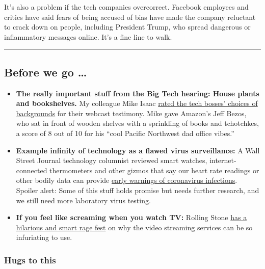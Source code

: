 It's also a problem if the tech companies overcorrect. Facebook
employees and critics have said fears of being accused of bias have made
the company reluctant to crack down on people, including President
Trump, who spread dangerous or inflammatory messages online. It's a fine
line to walk.

\begin{center}\rule{0.5\linewidth}{\linethickness}\end{center}

\hypertarget{before-we-go-}{%
\subsection{Before we go \ldots{}}\label{before-we-go-}}

\begin{itemize}
\item
  \textbf{The really important stuff from the Big Tech hearing: House
  plants and bookshelves.} My colleague Mike Isaac
  \href{https://www.nytimes.com/live/2020/07/29/technology/tech-ceos-hearing-testimony/tech-executives-looked-like-they-work-in-well-tech-offices}{rated
  the tech bosses' choices of backgrounds} for their webcast testimony.
  Mike gave Amazon's Jeff Bezos, who sat in front of wooden shelves with
  a sprinkling of books and tchotchkes, a score of 8 out of 10 for his
  ``cool Pacific Northwest dad office vibes.''
\item
  \textbf{Example infinity of technology as a flawed virus
  surveillance:} A Wall Street Journal technology columnist reviewed
  smart watches, internet-connected thermometers and other gizmos that
  say our heart rate readings or other bodily data can provide
  \href{https://www.wsj.com/articles/could-you-have-covid-19-soon-your-smartwatch-or-smart-ring-might-tell-you-11595949072}{early
  warnings of coronavirus infections}. Spoiler alert: Some of this stuff
  holds promise but needs further research, and we still need more
  laboratory virus testing.
\item
  \textbf{If you feel like screaming when you watch TV:} Rolling Stone
  \href{https://www.rollingstone.com/tv/tv-features/streaming-wars-user-experience-sepinwall-1031729/}{has
  a hilarious and smart rage fest} on why the video streaming services
  can be so infuriating to use.
\end{itemize}

\hypertarget{hugs-to-this}{%
\subsubsection{Hugs to this}\label{hugs-to-this}}

